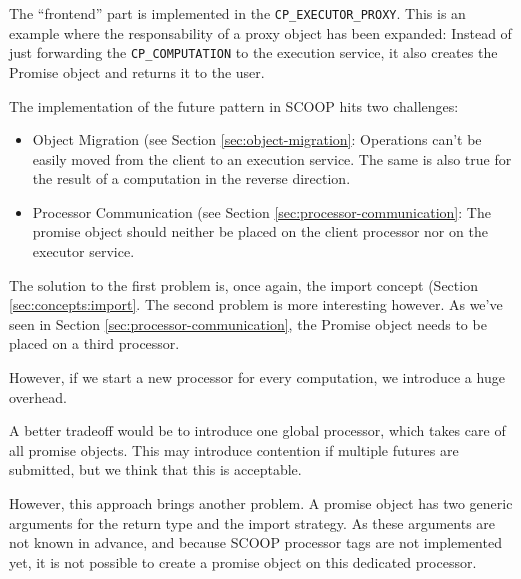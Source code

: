 The ``frontend'' part is implemented in the \lstinline!CP_EXECUTOR_PROXY!.
This is an example where the responsability of a proxy object has been expanded:
Instead of just forwarding the \lstinline!CP_COMPUTATION! to the execution service, it also creates the Promise object and returns it to the user.

The implementation of the future pattern in SCOOP hits two challenges:
\begin{itemize}
 \item Object Migration (see Section \ref{sec:object-migration}: Operations can't be easily moved from the client to an execution service.
 The same is also true for the result of a computation in the reverse direction.
 \item Processor Communication (see Section \ref{sec:processor-communication}: The promise object should neither be placed on the client processor nor on the executor service.
\end{itemize}

The solution to the first problem is, once again, the import concept (Section \ref{sec:concepts:import}.
The second problem is more interesting however.
As we've seen in Section \ref{sec:processor-communication}, the Promise object needs to be placed on a third processor.

However, if we start a new processor for every computation, we introduce a huge overhead.

A better tradeoff would be to introduce one global processor, which takes care of all promise objects.
This may introduce contention if multiple futures are submitted, but we think that this is acceptable.

However, this approach brings another problem.
A promise object has two generic arguments for the return type and the import strategy.
As these arguments are not known in advance, and because SCOOP processor tags \cite[p. 90]{Nienaltowski07} are not implemented yet, it is not possible to create a promise object on this dedicated processor.

